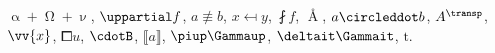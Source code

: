 \documentclass{article}
\begin{document}
$\upalpha+\upOmega+\upnu$, $\uppartial f$, $a\nequiv b$, $x\mapsfrom y$, $\fint f$, $\Angstrom$, $a\circleddot b$,
$A^\transp$, $\vv{x}$, $\laplac u$, $\cdotB$, $\llbracket a\rrbracket$, $\piup\Gammaup$, $\deltait\Gammait$, $\text{t}$.
\end{document}
